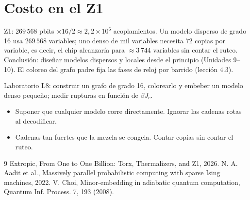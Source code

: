 \documentclass[11pt,a4paper]{article}
\begin{document}
\section{Costo en el Z1}
Z1: $269\,568$ pbits $\times16/2\approx2{,}2\times10^6$ acoplamientos. Un modelo disperso de grado 16 usa $269\,568$ variables; uno denso de mil variables
necesita 72 copias por variable, es decir, el chip alcanzaría para $\approx3\,744$ variables sin contar el ruteo. Conclusión: diseñar modelos dispersos y
locales desde el principio (Unidades 9--10). El coloreo del grafo padre fija las fases de reloj por barrido (lección 4.3).

\begin{aplicacion}
Laboratorio L8: construir un grafo de grado 16, colorearlo y embeber un modelo denso pequeño; medir rupturas en función de $\beta J_c$.
\end{aplicacion}

\begin{error}
\begin{itemize}[nosep]
\item Suponer que cualquier modelo corre directamente. \quad Ignorar las cadenas rotas al decodificar.
\item Cadenas tan fuertes que la mezcla se congela. \quad Contar copias sin contar el ruteo.
\end{itemize}
\end{error}

\begin{thebibliography}{9}\small
{} Extropic, From One to One Billion: Torx, Thermalizers, and Z1, 2026.
 N. A. Aadit et al., Massively parallel probabilistic computing with sparse Ising machines, 2022.
 V. Choi, Minor-embedding in adiabatic quantum computation, Quantum Inf. Process. 7, 193 (2008).
\end{thebibliography}
\end{document}
